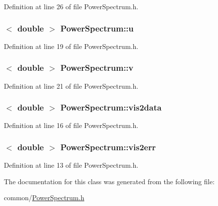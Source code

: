 Definition at line 26 of file PowerSpectrum.h.

\hypertarget{classPowerSpectrum_a42e71945396d45b5603b5ea1f4933a6a}{
\subsubsection[{u}]{$<$ double $>$ {\bf PowerSpectrum::u}}}
\label{classPowerSpectrum_a42e71945396d45b5603b5ea1f4933a6a}


Definition at line 19 of file PowerSpectrum.h.

\hypertarget{classPowerSpectrum_a48e7c06920fc8baaa690a7fcf71284d7}{
\subsubsection[{v}]{$<$ double $>$ {\bf PowerSpectrum::v}}}
\label{classPowerSpectrum_a48e7c06920fc8baaa690a7fcf71284d7}


Definition at line 21 of file PowerSpectrum.h.

\hypertarget{classPowerSpectrum_a98e7a9d427be82f83bc9e925d8a44d71}{
\subsubsection[{vis2data}]{$<$ double $>$ {\bf PowerSpectrum::vis2data}}}
\label{classPowerSpectrum_a98e7a9d427be82f83bc9e925d8a44d71}


Definition at line 16 of file PowerSpectrum.h.

\hypertarget{classPowerSpectrum_a68e8c6a4fa15893a796f233e35b9886a}{
\subsubsection[{vis2err}]{$<$ double $>$ {\bf PowerSpectrum::vis2err}}}
\label{classPowerSpectrum_a68e8c6a4fa15893a796f233e35b9886a}


Definition at line 13 of file PowerSpectrum.h.



The documentation for this class was generated from the following file:\begin{DoxyCompactItemize}
\item 
common/\hyperlink{PowerSpectrum_8h}{PowerSpectrum.h}\end{DoxyCompactItemize}
